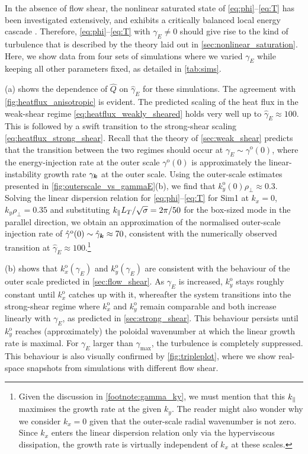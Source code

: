 \documentclass{jpp}
\newcommand{\kxo}{k_x^\text{o}}
\newcommand{\kyo}{k_y^\text{o}}
\newcommand{\kyoO}{k_{y}^\text{o}(0)}
\newcommand{\gammaoO}{\gamma^\text{o}(0)}
\newcommand{\gammaE}{\gamma_{E}}
\newcommand{\gammaEhat}{\hat{\gamma}_{E}}
\begin{document}
In the absence of flow shear, the nonlinear saturated state of \cref{eq:phi}--\cref{eq:T} has been investigated extensively, and exhibits a critically balanced local energy cascade \citep{adkins23}. Therefore, \mbox{\cref{eq:phi}--\cref{eq:T}} with \(\gammaE\neq0\) should give rise to the kind of turbulence that is described by the theory laid out in \cref{sec:nonlinear_saturation}. Here, we show data from four sets of simulations where we varied \(\gammaE\) while keeping all other parameters fixed, as detailed in \cref{tab:sims}. 

(a) shows the dependence of $\hat{Q}$ on \(\gammaEhat\) for these simulations. The agreement with \cref{fig:heatflux_anisotropic} is evident. The predicted scaling of the heat flux in the weak-shear regime \cref{eq:heatflux_weakly_sheared} holds very well up to \(\gammaEhat \approx 100\). This is followed by a swift transition to the strong-shear scaling \cref{eq:heatflux_strong_shear}. Recall that the theory of \cref{sec:weak_shear} predicts that the transition between the two regimes should occur at \(\gammaE \sim \gammaoO\), where the energy-injection rate at the outer scale \(\gammaoO\) is approximately the linear-instability growth rate \(\gamma_{\boldsymbol{k}}\) at the outer scale. Using the outer-scale estimates presented in \cref{fig:outerscale_vs_gammaE}(b), we find that \(\kyoO\rho_\perp \approx 0.3\). Solving the linear dispersion relation for \cref{eq:phi}--\cref{eq:T} for Sim1 at \(k_x = 0\), \(k_y\rho_\perp=0.35\) and substituting \(k_\parallel L_T/\sqrt{\sigma} = 2\pi/50\) for the box-sized mode in the parallel direction, we obtain an approximation of the normalised outer-scale injection rate of \(\hat{\gamma}^\text{o}(0) \sim \hat{\gamma}_{\boldsymbol{k}} \approx 70\), consistent with the numerically observed transition at \(\gammaEhat \approx 100\).\footnote{Given the discussion in \cref{footnote:gamma_ky}, we must mention that this \(k_\parallel\) maximises the growth rate at the given \(k_y\). The reader might also wonder why we consider \(k_x = 0\) given that the outer-scale radial wavenumber is not zero. Since \(k_x\) enters the linear dispersion relation only via the hyperviscous dissipation, the growth rate is virtually independent of \(k_x\) at these scales.}

(b) shows that \(\kxo(\gammaE)\) and \(\kyo(\gammaE)\) are consistent with the behaviour of the outer scale predicted in \cref{sec:flow_shear}. As \(\gammaE\) is increased, \(\kyo\) stays roughly constant until \(\kxo\) catches up with it, whereafter the system transitions into the strong-shear regime where \(\kxo\) and \(\kyo\) remain comparable and both increase linearly with \(\gammaE\), as predicted in \cref{sec:strong_shear}. This behaviour persists until \(\kyo\) reaches (approximately) the poloidal wavenumber at which the linear growth rate is maximal. For \(\gammaE\) larger than \(\gamma_\text{max}\), the turbulence is completely suppressed. This behaviour is also visually confirmed by \cref{fig:tripleplot}, where we show real-space snapshots from simulations with different flow shear. 
\end{document}
